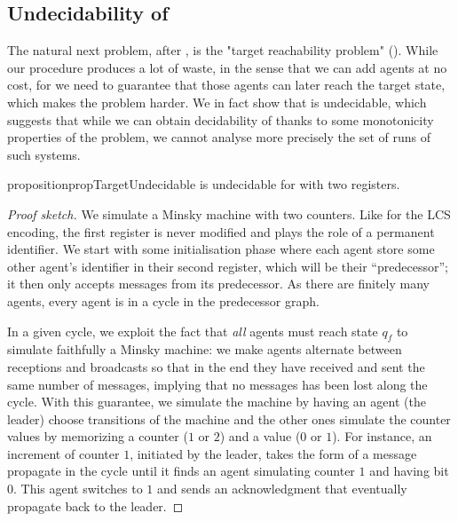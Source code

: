 \subsection{Undecidability of \TARGET}
\label{sec:undec-target}

The natural next problem, after \COVER, is the "target reachability problem" (\TARGET).  
While our \COVER procedure produces a lot of waste, in the sense that we can add agents at no cost, for \TARGET we need to guarantee that those agents can later reach the target state, which makes the problem harder. 
We in fact show that \TARGET is undecidable, which suggests that while we can obtain decidability of \COVER thanks to some monotonicity properties of the problem, we cannot analyse more precisely the set of runs of such systems.

\begin{restatable}{proposition}{propTargetUndecidable}
\label{prop:target-undec}
\TARGET is undecidable for \BNRA with two registers.
\end{restatable}

\begin{proof}[Proof sketch]
We simulate a Minsky machine with two counters. Like for the LCS encoding, the first register is never modified and plays the role of a permanent identifier. We start with some initialisation phase where each agent store some other agent's identifier in their second register, which will be their ``predecessor''; it then only accepts messages from its predecessor. As there are finitely many agents, every agent is in a cycle in the predecessor graph. 

In a given cycle, we exploit the fact that \emph{all} agents must reach state $q_f$ to simulate faithfully a Minsky machine: we make agents alternate between receptions and broadcasts so that in the end they have received and sent the same number of messages, implying that no messages has been lost along the cycle.
With this guarantee, we simulate the machine by having an agent (the leader) choose transitions of the machine and the other ones simulate the counter values by memorizing a counter ($1$ or $2$) and a value ($0$ or $1$). For instance, an increment of counter $1$, initiated by the leader, takes the form of a message propagate in the cycle until it finds an agent simulating counter $1$ and having bit $0$. This agent switches to $1$ and sends an acknowledgment that eventually propagate back to the leader.
\end{proof}
